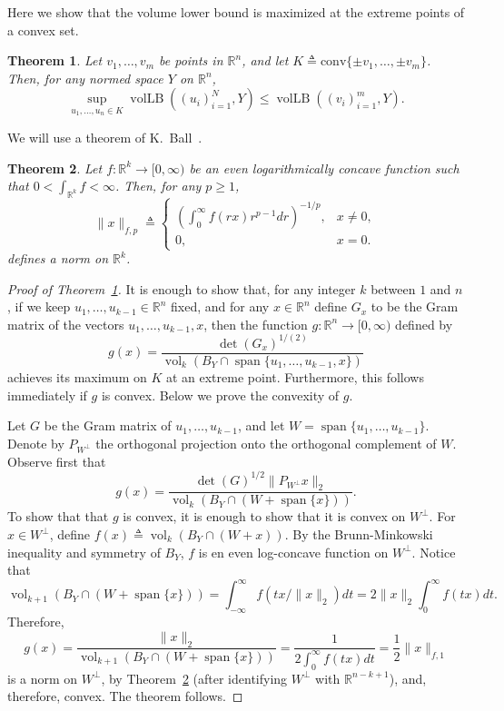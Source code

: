 \documentclass{article}
\newtheorem{theorem}{Theorem}
\newcommand{\R}{{\mathbb{R}}}
\newcommand{\eqdef}{\triangleq}
\DeclareMathOperator{\vollb}{volLB}
\DeclareMathOperator{\vol}{vol}
\DeclareMathOperator{\lspan}{span}
\begin{document}
Here we show that the volume lower bound is maximized at the extreme
points of a convex set.

\begin{theorem}\label{thm:conv-hull}
  Let $v_1, \ldots, v_m$ be points in $\R^n$, and let $K \eqdef
  \mathrm{conv}\{\pm v_1, \ldots, \pm v_m\}$. Then, for any normed
  space $Y$ on $\R^n$, 
  \[
  \sup_{u_1, \ldots, u_n \in K}\vollb((u_i)_{i = 1}^N, Y)
  \le
  \vollb((v_i)_{i = 1}^m, Y).
  \]
\end{theorem}

We will use a theorem of K.~Ball~\cite{Ball88}.

\begin{theorem}\label{thm:ball-logconcave}
  Let $f: \R^k \to [0, \infty)$ be an even logarithmically concave
  function such that $0 < \int_{\R^k} f < \infty$. Then, for any $p
  \ge 1$, 
  \[
  \|x\|_{f,p} \eqdef 
  \begin{cases}
    \left(\int_0^\infty f(rx) r^{p-1}dr\right)^{-1/p}, &x \neq 0,\\
    0, &x = 0.
  \end{cases}
  \]
  defines a norm on $\R^k$. 
\end{theorem}


\begin{proof}[Proof of Theorem~\ref{thm:conv-hull}]
  It is enough to show that, for any integer $k$ between $1$ and $n$,
  if we keep $u_1, \ldots, u_{k-1} \in \R^n$ fixed, and for any $x\in
  \R^n$ define $G_x$ to be the Gram matrix of the vectors $u_1,
  \ldots, u_{k-1}, x$, then the function $g: \R^n \to [0, \infty)$
  defined by
  \[
  g(x) = \frac{\det(G_x)^{1/(2)}}{\vol_k(B_Y \cap \lspan\{u_1,
    \ldots, u_{k-1}, x\})}
  \]
  achieves its maximum on $K$ at an extreme point. Furthermore, this
  follows immediately if $g$ is convex. Below we prove the convexity
  of $g$.

  Let $G$ be the Gram matrix of $u_1, \ldots, u_{k-1}$, and let $W =
  \lspan\{u_1, \ldots, u_{k-1}\}$. Denote by $P_{W^\perp}$ the
  orthogonal projection onto the orthogonal complement of $W$.
  Observe first that
  \[
  g(x) = \frac{\det(G)^{1/2}\|P_{W^\perp}x\|_2}{\vol_k(B_Y \cap (W +
    \lspan\{x\}))}. 
  \]
  To show that that $g$ is convex, it is enough to show that it is
  convex on $W^\perp$.  For $x \in W^\perp$, define $f(x) \eqdef
  \vol_{k}(B_Y \cap (W + x))$. By the Brunn-Minkowski inequality and
  symmetry of $B_Y$, $f$ is en even log-concave function on
  $W^\perp$. Notice that
  \[
  \vol_{k+1}(B_Y \cap  (W + \lspan\{x\}))
  = 
  \int_{-\infty}^\infty{f(tx/\|x\|_2)dt} 
  = 
  2\|x\|_2 \int_{0}^\infty{f(tx)dt}.
  \]
  Therefore, 
  \[
  g(x) = 
  \frac{\|x\|_2}{\vol_{k+1}(B_Y \cap  (W + \lspan\{x\}))}
  = 
  \frac{1}{2\int_{0}^\infty{f(tx)dt}}
  = \frac{1}{2}\|x\|_{f,1}
  \]
  is a norm on $W^\perp$, by Theorem~\ref{thm:ball-logconcave} (after
  identifying $W^\perp$ with $\R^{n-k+1}$), and, therefore, convex. The
  theorem follows.
\end{proof}
\end{document}
